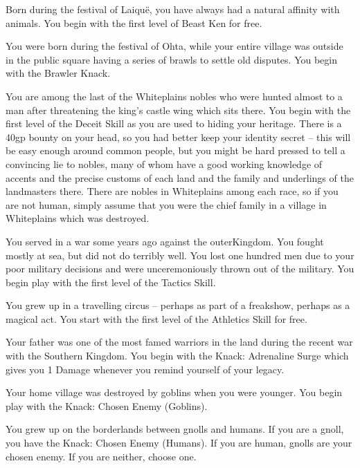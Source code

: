 \begin{multicols}{2}
\begin{list}{\addtocounter{list}{1}\textbf{:}}{\raggedleft}
	\item
	Born during the festival of Laiqu\"{e}, you have always had a natural affinity with animals.
	You begin with the first level of Beast Ken for free.

	\item
	You were born during the festival of Ohta, while your entire village was outside in the public square having a series of brawls to settle old disputes.
	You begin with the Brawler Knack.

	\item
	You are among the last of the Whiteplains nobles who were hunted almost to a man after threatening the king's castle wing which sits there.
	You begin with the first level of the Deceit Skill as you are used to hiding your heritage.
	There is a 40gp bounty on your head, so you had better keep your identity secret -- this will be easy enough around common people, but you might be hard pressed to tell a convincing lie to nobles, many of whom have a good working knowledge of accents and the precise customs of each land and the family and underlings of the landmasters there.
	There are nobles in Whiteplains among each race, so if you are not human, simply assume that you were the chief family in a village in Whiteplains which was destroyed.

	\item
	You served in a war some years ago against the \gls{outerKingdom}.
	You fought mostly at sea, but did not do terribly well.
	You lost one hundred men due to your poor military decisions and were unceremoniously thrown out of the military.
	You begin play with the first level of the Tactics Skill.

	\item
	You grew up in a travelling circus -- perhaps as part of a freakshow, perhaps as a magical act.
	You start with the first level of the Athletics Skill for free.

	\item
	Your father was one of the most famed warriors in the land during the recent war with the Southern Kingdom.
	You begin with the Knack: Adrenaline Surge which gives you 1 Damage whenever you remind yourself of your legacy.

	\item
	Your home village was destroyed by goblins when you were younger.
	You begin play with the Knack: Chosen Enemy (Goblins).

	\item
	You grew up on the borderlands between gnolls and humans.
	If you are a gnoll, you have the Knack: Chosen Enemy (Humans).
	If you are human, gnolls are your chosen enemy.
	If you are neither, choose one.


\end{list}
\end{multicols}
